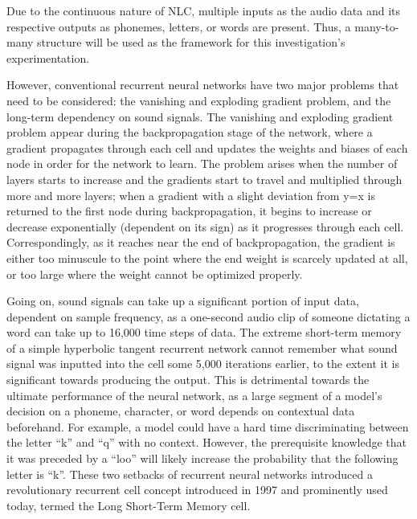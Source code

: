 Due to the continuous nature of NLC, multiple inputs as the audio data and its respective outputs as phonemes, letters, or words are present. Thus, a many-to-many structure will be used as the framework for this investigation’s experimentation.
\newline\par
However, conventional recurrent neural networks have two major problems that need to be considered: the vanishing and exploding gradient problem, and the long-term dependency on sound signals. The vanishing and exploding gradient problem appear during the backpropagation stage of the network, where a gradient propagates through each cell and updates the weights and biases of each node in order for the network to learn. The problem arises when the number of layers starts to increase and the gradients start to travel and multiplied through more and more layers; when a gradient with a slight deviation from y=x is returned to the first node during backpropagation, it begins to increase or decrease exponentially (dependent on its sign) as it progresses through each cell. Correspondingly, as it reaches near the end of backpropagation, the gradient is either too minuscule to the point where the end weight is scarcely updated at all, or too large where the weight cannot be optimized properly.
\newline\par
Going on, sound signals can take up a significant portion of input data, dependent on sample frequency, as a one-second audio clip of someone dictating a word can take up to 16,000 time steps of data. The extreme short-term memory of a simple hyperbolic tangent recurrent network cannot remember what sound signal was inputted into the cell some 5,000 iterations earlier, to the extent it is significant towards producing the output. This is detrimental towards the ultimate performance of the neural network, as a large segment of a model’s decision on a phoneme, character, or word depends on contextual data beforehand. For example, a model could have a hard time discriminating between the letter “k” and “q” with no context. However, the prerequisite knowledge that it was preceded by a “loo” will likely increase the probability that the following letter is “k”. These two setbacks of recurrent neural networks introduced a revolutionary recurrent cell concept introduced in 1997 and prominently used today, termed the Long Short-Term Memory cell.

